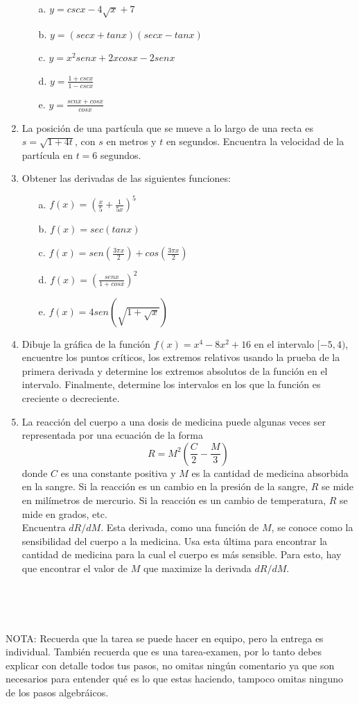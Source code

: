 \documentclass {article}
\begin{document}
\begin{enumerate}
\begin{itemize}
\item [a.] $y=csc x-4\sqrt{x}+7$
\item [b.] $y=(sec x+tan x)(sec x-tan x)$
\item [c.] $y=x^2 sen x+2x cos x-2 senx$
\item [d.] $y=\frac{1+csc x}{1-csc x}$
\item [e.] $y=\frac{sen x+cos x}{cos x}$
\end{itemize}


\item La posici\'on de una part\'icula que se mueve a lo largo de una recta es $s=\sqrt{1+4t}$, con $s$ en metros y $t$ en segundos. Encuentra la velocidad de la part\'icula en $t=6$ segundos.  

\item Obtener las derivadas de las siguientes funciones:

\begin{itemize}
\item [a.] $f(x)=(\frac{x}{5}+\frac{1}{5x})^5$
\item [b.] $f(x)=sec(tan x)$
\item [c.] $f(x)=sen (\frac{3\pi x}{2})+cos (\frac{3\pi x}{2})$
\item [d.] $f(x)=(\frac{sen x}{1+cos x})^2$
\item [e.] $f(x)=4 sen(\sqrt{1+\sqrt{x}})$
\end{itemize}


\item Dibuje la gr\'afica de la funci\'on $f(x)=x^4-8x^2+16$ en el intervalo $[-5,4)$, encuentre los puntos cr\'iticos, los extremos relativos usando la prueba de la primera derivada y determine los extremos absolutos de la funci\'on en el intervalo. Finalmente, determine los intervalos en los que la funci\'on es creciente o decreciente.

\item La reacci\'on del cuerpo a una dosis de medicina puede algunas veces ser representada por una ecuaci\'on de la forma $$R=M^2(\frac{C}{2}-\frac{M}{3})$$ donde $C$ es una constante positiva y $M$ es la cantidad de medicina absorbida en la sangre. Si la reacci\'on es un cambio en la presi\'on de la sangre, $R$ se mide en mil\'imetros de mercurio. Si la reacci\'on es un cambio de temperatura, $R$ se mide en grados, etc. \\


Encuentra $dR/dM$. Esta derivada, como una funci\'on de $M$, se conoce como la sensibilidad del cuerpo a la medicina. Usa esta \'ultima para encontrar la cantidad de medicina para la cual el cuerpo es m\'as sensible. Para esto, hay que encontrar el valor de $M$ que maximize la derivada $dR/dM$.

\end{enumerate}

\

\

NOTA: Recuerda que la tarea se puede hacer en equipo, pero la entrega es individual. Tambi\'en recuerda que es una tarea-examen, por lo tanto debes explicar con detalle todos tus pasos, no omitas ning\'un comentario ya que son necesarios para entender qu\'e es lo que estas haciendo, tampoco omitas ninguno de los pasos algebr\'aicos.
\end{document}
